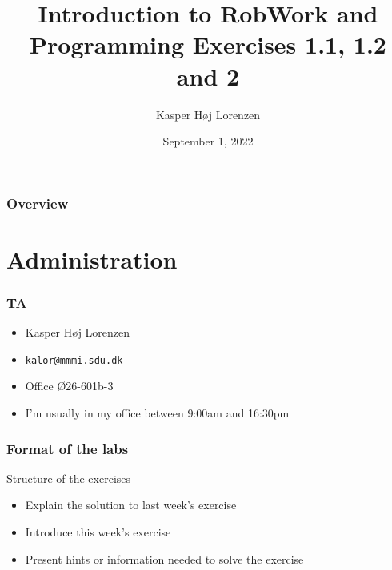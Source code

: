 \documentclass{beamer}
\title[RobWork Intro]{Introduction to RobWork and Programming Exercises 1.1, 1.2 and 2} %
\author{Kasper Høj Lorenzen} %
\institute[SDU Robotics] %
{
Univeristy of Southern Denmark \\ %
\medskip
\textit{Kalor@mmmi.sdu.dk} %
}
\date{September 1, 2022} %
\begin{document}
\begin{frame}
\titlepage %
\end{frame}

\begin{frame}
\frametitle{Overview} %
\tableofcontents %
\end{frame}


\section{Administration} %

\begin{frame}
\frametitle{TA}
\begin{itemize}
\item Kasper Høj Lorenzen
\item \texttt{kalor@mmmi.sdu.dk}
\item Office Ø26-601b-3 
\item I'm usually in my office between 9:00am and 16:30pm
\end{itemize}
\end{frame}


\begin{frame}
  \frametitle{Format of the labs}
  Structure of the exercises 
\begin{itemize}
\item Explain the solution to last week's exercise
\item Introduce this week's exercise
\item Present hints or information needed to solve the exercise
\end{itemize}
\end{frame}
\end{document}
